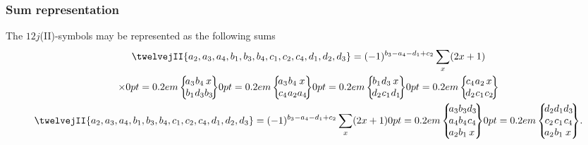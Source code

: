\subsubsection{Sum representation}
The $12j$(II)-symbols may be represented as the following sums
\begin{gather}
\twelvejII{a_{2},a_{3},a_{4},b_{1},b_{3},b_{4},c_{1},c_{2},c_{4},d_{1},d_{2},d_{3}}=(-1)^{b_{3}-a_{4}-d_{1}+c_{2}} \sum_{x}(2 x+1)  \notag\\
\times\sixj{a_{3}}{b_{4}}{x}{b_{1}}{d_{3}}{b_{3}}\sixj{a_{3}}{b_{4}}{x}{c_{4}}{a_{2}}{a_{4}}\sixj{b_{1}}{d_{3}}{x}{d_{2}}{c_{1}}{d_{1}}\sixj{c_{4}}{a_{2}}{x}{d_{2}}{c_{1}}{c_{2}}  \label{eq:10:13:26}\\
\twelvejII{a_{2},a_{3},a_{4},b_{1},b_{3},b_{4},c_{1},c_{2},c_{4},d_{1},d_{2},d_{3}}=(-1)^{b_{3}-a_{4}-d_{1}+c_{2}} \sum_{x}(2 x+1)\ninej{a_{3}}{b_{3}}{d_{3}}{a_{4}}{b_{4}}{c_{4}}{a_{2}}{b_{1}}{x}\ninej{d_{2}}{d_{1}}{d_{3}}{c_{2}}{c_{1}}{c_{4}}{a_{2}}{b_{1}}{x} . \notag
\end{gather}

